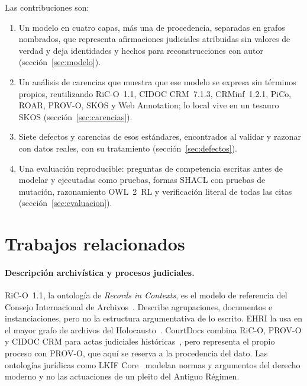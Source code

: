 \documentclass[runningheads]{llncs}
\begin{document}
Las contribuciones son:
\begin{enumerate}
\item Un modelo en cuatro capas, más una de procedencia, separadas en grafos nombrados, que representa afirmaciones
  judiciales atribuidas sin valores de verdad y deja identidades y hechos para reconstrucciones con autor
  (sección~\ref{sec:modelo}).
\item Un análisis de carencias que muestra que ese modelo se expresa sin términos propios, reutilizando RiC-O~1.1,
  CIDOC CRM~7.1.3, CRMinf~1.2.1, PiCo, ROAR, PROV-O, SKOS y Web Annotation; lo local vive en un tesauro SKOS
  (sección~\ref{sec:carencias}).
\item Siete defectos y carencias de esos estándares, encontrados al validar y razonar con datos reales, con su
  tratamiento (sección~\ref{sec:defectos}).
\item Una evaluación reproducible: preguntas de competencia escritas antes de modelar y ejecutadas como pruebas,
  formas SHACL con pruebas de mutación, razonamiento OWL~2~RL y verificación literal de todas las citas
  (sección~\ref{sec:evaluacion}).
\end{enumerate}

\section{Trabajos relacionados}\label{sec:relacionados}

\paragraph{Descripción archivística y procesos judiciales.}
RiC-O~1.1, la ontología de \emph{Records in Contexts}, es el modelo de referencia del Consejo Internacional de
Archivos~\cite{riccm10,rico11,clavaud2021rico}. Describe agrupaciones, documentos e instanciaciones, pero no la
estructura argumentativa de lo escrito. EHRI la usa en el mayor grafo de archivos del
Holocausto~\cite{garciagonzalez2023ehri}. CourtDocs combina RiC-O, PROV-O y CIDOC CRM para actas judiciales
históricas~\cite{vafaie2023courtdocs}, pero representa el propio proceso con PROV-O, que aquí se reserva a la
procedencia del dato. Las ontologías jurídicas como LKIF Core~\cite{hoekstra2009lkif} modelan normas y argumentos del
derecho moderno y no las actuaciones de un pleito del Antiguo Régimen.
\end{document}
